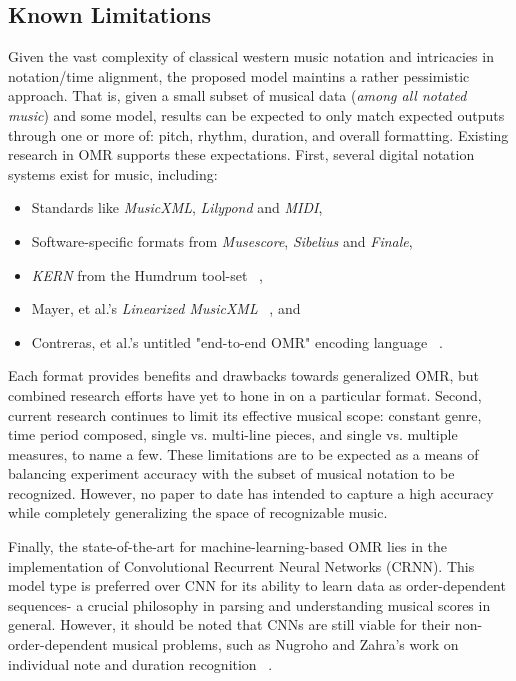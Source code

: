 \documentclass[nonacm, sigconf]{acmart}
\begin{document}
\subsection{Known Limitations}

Given the vast complexity of classical western music notation and intricacies in notation/time alignment, the proposed model maintins a rather pessimistic approach. 
That is, given a small subset of musical data (\textit{among all notated music}) and some model, results can be expected to only match expected outputs through one or more of: pitch, rhythm, duration, and overall formatting.
Existing research in OMR supports these expectations. First, several digital notation systems exist for music, including: 

\begin{itemize}
	\item Standards like \textit{MusicXML}, \textit{Lilypond} and \textit{MIDI},
	\item Software-specific formats from \textit{Musescore}, \textit{Sibelius} and \textit{Finale},
	\item \textit{KERN} from the Humdrum tool-set ~\cite{contreras2023omrpiano},
	\item Mayer, et al.'s \textit{Linearized MusicXML} ~\cite{mayer2024practical}, and
	\item Contreras, et al.'s untitled "end-to-end OMR" encoding language ~\cite{contreras2023omrcnn}.
\end{itemize} 

Each format provides benefits and drawbacks towards generalized OMR, but combined research efforts have yet to hone in on a particular format.
Second, current research continues to limit its effective musical scope: constant genre, time period composed, single vs. multi-line pieces, and single vs. multiple measures, to name a few.
These limitations are to be expected as a means of balancing experiment accuracy with the subset of musical notation to be recognized. 
However, no paper to date has intended to capture a high accuracy while completely generalizing the space of recognizable music.

Finally, the state-of-the-art for machine-learning-based OMR lies in the implementation of Convolutional Recurrent Neural Networks (CRNN). 
This model type is preferred over CNN for its ability to learn data as order-dependent sequences- a crucial philosophy in parsing and understanding musical scores in general. 
However, it should be noted that CNNs are still viable for their non-order-dependent musical problems, such as Nugroho and Zahra's work on individual note and duration recognition ~\cite{nugroho_zahra_2024}.
\end{document}
